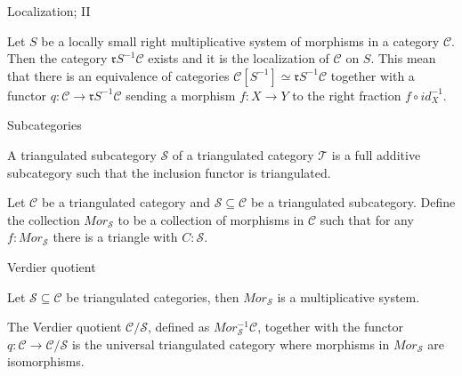 \documentclass{beamer}
\begin{document}
            \begin{frame}{Localization; II}
                \begin{theorem}
                    Let $S$ be a locally small right multiplicative system of morphisms in a category $\mathcal{C}$. Then the category $\mathfrak{r}S^{-1}\mathcal{C}$ exists and it is the localization of $\mathcal{C}$ on $S$. This mean that there is an equivalence of categories $\mathcal{C}[S^{-1}]\simeq\mathfrak{r}S^{-1}\mathcal{C}$ together with a functor $q: \mathcal{C}\rightarrow\mathfrak{r}S^{-1}\mathcal{C}$ sending a morphism $f : X\rightarrow Y$ to the right fraction $f\circ id_X^{-1}$.
                \end{theorem}
            \end{frame}

            \begin{frame}{Subcategories}
                \begin{definition}
                    A triangulated subcategory $\mathcal{S}$ of a triangulated category $\mathcal{T}$ is a full additive subcategory such that the inclusion functor is triangulated.
                \end{definition}

                \begin{definition}
                    Let $\mathcal{C}$ be a triangulated category and $\mathcal{S} \subseteq \mathcal{C}$ be a triangulated subcategory. Define the collection $Mor_{\mathcal{S}}$ to be a collection of morphisms in $\mathcal{C}$ such that for any $f : Mor_{\mathcal{S}}$ there is a triangle with $C : \mathcal{S}$.
                    \begin{center}
                    \end{center}
                \end{definition}
            \end{frame}


            \begin{frame}{Verdier quotient}
                \begin{lemma}
                    Let $\mathcal{S}\subseteq\mathcal{C}$ be triangulated categories, then $Mor_\mathcal{S}$ is a multiplicative system.
                \end{lemma}

                \begin{theorem}
                    The Verdier quotient $\mathcal{C}/\mathcal{S}$, defined as $Mor_\mathcal{S}^{-1}\mathcal{C}$, together with the functor $q:\mathcal{C}\rightarrow\mathcal{C}/\mathcal{S}$ is the universal triangulated category where morphisms in $Mor_\mathcal{S}$ are isomorphisms.
                \end{theorem}
            \end{frame}
\end{document}
